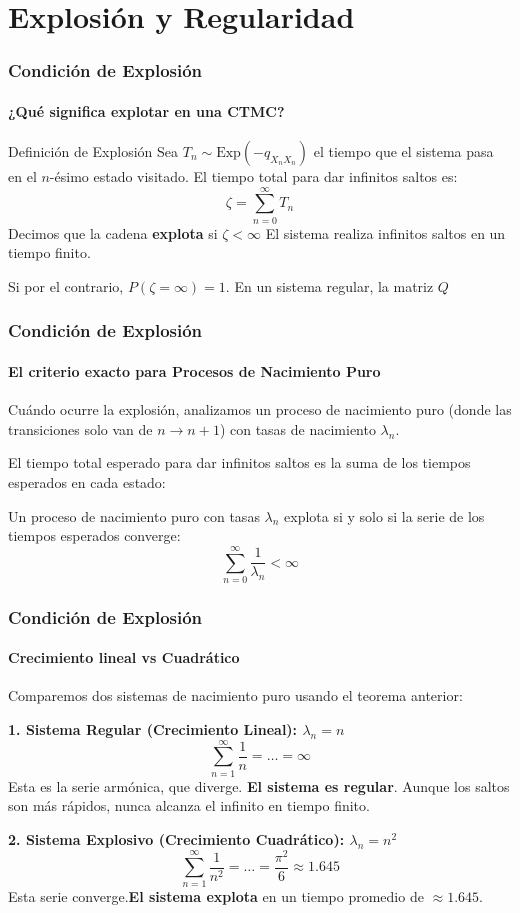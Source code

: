 \documentclass{beamer}
\begin{document}
\section{Explosión y Regularidad}

\begin{frame}
\frametitle{Condición de Explosión}
\framesubtitle{¿Qué significa explotar en una CTMC?}


\begin{block}{Definición de Explosión}
Sea $T_n \sim \text{Exp}(-q_{X_n X_n})$ el tiempo que el sistema pasa en el $n$-ésimo estado visitado. El tiempo total para dar infinitos saltos es:
\[ \zeta = \sum_{n=0}^\infty T_n \]
Decimos que la cadena \textbf{explota} si $\zeta < \infty$ El sistema realiza infinitos saltos en un tiempo finito.
\end{block}

\vspace{0.2cm}
Si por el contrario, $P(\zeta = \infty) = 1$. En un sistema regular, la matriz $Q$

\end{frame}


\begin{frame}
\frametitle{Condición de Explosión}
\framesubtitle{El criterio exacto para Procesos de Nacimiento Puro}

Cuándo ocurre la explosión, analizamos un proceso de nacimiento puro (donde las transiciones solo van de $n \to n+1$) con tasas de nacimiento $\lambda_n$.

El tiempo total esperado para dar infinitos saltos es la suma de los tiempos esperados en cada estado:


\begin{theorem}
Un proceso de nacimiento puro con tasas $\lambda_n$ explota si y solo si la serie de los tiempos esperados converge:
\[ \sum_{n=0}^\infty \frac{1}{\lambda_n} < \infty \]
\end{theorem}

\end{frame}


\begin{frame}
\frametitle{Condición de Explosión}
\framesubtitle{Crecimiento lineal vs Cuadrático}

Comparemos dos sistemas de nacimiento puro usando el teorema anterior:

\vspace{0.3cm}
\textbf{1. Sistema Regular (Crecimiento Lineal): $\lambda_n = n$}
\[ \sum_{n=1}^\infty \frac{1}{n} =  \dots = \infty \]
Esta es la serie armónica, que diverge. \textbf{El sistema es regular}. Aunque los saltos son más rápidos, nunca alcanza el infinito en tiempo finito.

\vspace{0.3cm}
\textbf{2. Sistema Explosivo (Crecimiento Cuadrático): $\lambda_n = n^2$}
\[ \sum_{n=1}^\infty \frac{1}{n^2} = \dots = \frac{\pi^2}{6} \approx 1.645 \]
Esta serie converge.\textbf{El sistema explota} en un tiempo promedio de $\approx 1.645$.
\end{frame}
\end{document}
